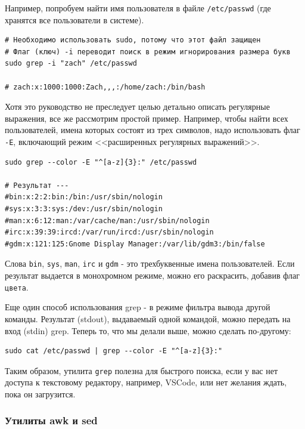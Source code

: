 \documentclass[12pt]{article}
\begin{document}
Например, попробуем найти имя пользователя в файле \texttt{/etc/passwd}
(где хранятся все пользователи в системе).

\begin{verbatim}
# Необходимо использовать sudo, потому что этот файл защищен
# Флаг (ключ) -i переводит поиск в режим игнорирования размера букв
sudo grep -i "zach" /etc/passwd

# zach:x:1000:1000:Zach,,,:/home/zach:/bin/bash
\end{verbatim}

Хотя это руководство не преследует целью детально описать регулярные
выражения, все же рассмотрим простой пример. Например, чтобы найти всех
пользователей, имена которых состоят из трех символов, надо использовать
флаг \texttt{-E}, включающий режим <<расширенных регулярных выражений>>.

\begin{verbatim}
sudo grep --color -E "^[a-z]{3}:" /etc/passwd

# Результат ---
#bin:x:2:2:bin:/bin:/usr/sbin/nologin
#sys:x:3:3:sys:/dev:/usr/sbin/nologin
#man:x:6:12:man:/var/cache/man:/usr/sbin/nologin
#irc:x:39:39:ircd:/var/run/ircd:/usr/sbin/nologin
#gdm:x:121:125:Gnome Display Manager:/var/lib/gdm3:/bin/false
\end{verbatim}

Слова \texttt{bin}, \texttt{sys}, \texttt{man}, \texttt{irc} и \texttt{gdm} - это трехбуквенные имена пользователей. Если результат выдается в монохромном
режиме, можно его раскрасить, добавив флаг \texttt{цвета}.

Еще один способ использования grep - в режиме фильтра вывода другой
команды. Результат (stdout), выдаваемый одной командой, можно передать
на вход (stdin) grep. Теперь то, что мы делали выше, можно сделать
по-другому:

\begin{verbatim}
sudo cat /etc/passwd | grep --color -E "^[a-z]{3}:"
\end{verbatim}

Таким образом, утилита \texttt{grep} полезна для быстрого поиска, если у
вас нет доступа к текстовому редактору, например, VSCode, или нет
желания ждать, пока он загрузится.

\hypertarget{awk-and-sed}{%
\subsubsection{\texorpdfstring{\protect\hyperlink{awk-and-sed}{}Утилиты
awk и sed}{Утилиты awk и sed}}\label{awk-and-sed}}
\end{document}
